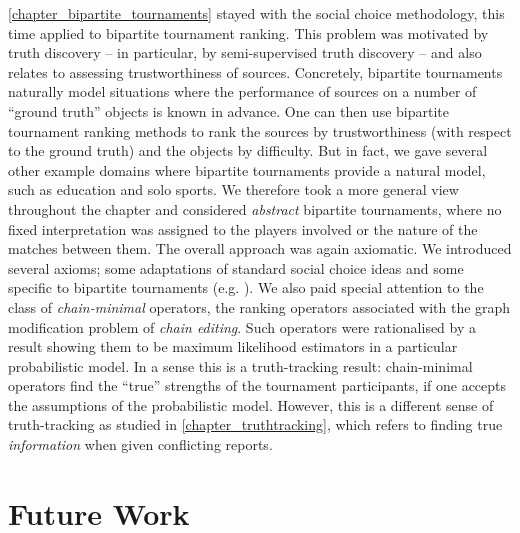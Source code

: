 {
    

\cref{chapter_bipartite_tournaments} stayed with the social choice methodology,
this time applied to bipartite tournament ranking. This problem was motivated
by truth discovery -- in particular, by semi-supervised truth discovery -- and
also relates to assessing trustworthiness of sources. Concretely, bipartite
tournaments naturally model situations where the performance of sources on a
number of ``ground truth'' objects is known in advance. One can then use
bipartite tournament ranking methods to rank the sources by trustworthiness
(with respect to the ground truth) and the objects by difficulty. But in fact,
we gave several other example domains where bipartite tournaments provide a
natural model, such as education and solo sports. We therefore took a more
general view throughout the chapter and considered \emph{abstract} bipartite
tournaments, where no fixed interpretation was assigned to the players involved
or the nature of the matches between them. The overall approach was again
axiomatic.  We introduced several axioms; some adaptations of standard social
choice ideas and some specific to bipartite tournaments (e.g. \dualaxiom). We
also paid special attention to the class of \emph{chain-minimal} operators, the
ranking operators associated with the graph modification problem of \emph{chain
editing}. Such operators were rationalised by a result showing them to be
maximum likelihood estimators in a particular probabilistic model. In a sense
this is a truth-tracking result: chain-minimal operators find the ``true''
strengths of the tournament participants, if one accepts the assumptions of the
probabilistic model. However, this is a different sense of truth-tracking as
studied in \cref{chapter_truthtracking}, which refers to finding true
\emph{information} when given conflicting reports.

}


\section{Future Work}
